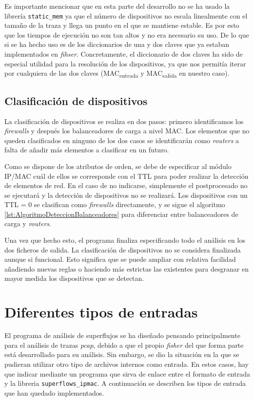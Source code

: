 \documentclass[twoside, 12pt]{epstfg}
\begin{document}
Es importante mencionar que en esta parte del desarrollo no se ha usado la librería \texttt{static\_mem} ya que el número de dispositivos no escala linealmente con el tamaño de la traza y llega un punto en el que se mantiene estable. Es por esto que los tiempos de ejecución no son tan altos y no era necesario su uso. De lo que si se ha hecho uso es de los diccionarios de una y dos claves que ya estaban implementados en \textit{fihser}. Concretamente, el diccionario de dos claves ha sido de especial utilidad para la resolución de los dispositivos, ya que nos permitía iterar por cualquiera de las dos claves (MAC\textsubscript{entrada} y MAC\textsubscript{salida} en nuestro caso).

\subsection{Clasificación de dispositivos}
La clasificación de dispositivos se realiza en dos pasos: primero identificamos los \textit{firewalls} y después los balanceadores de carga a nivel MAC. Los elementos que no queden clasificados en ninguno de los dos casos se identificarán como \textit{routers} a falta de añadir más elementos a clasificar en un futuro.

Como se dispone de los atributos de orden, se debe de especificar al módulo IP/MAC cuál de ellos se corresponde con el TTL para poder realizar la detección de elementos de red. En el caso de no indicarse, simplemente el postprocesado no se ejecutará y la detección de dispositivos no se realizará. Los dispositivos con un TTL = 0 se clasifican como \textit{firewalls} directamente, y se sigue el algoritmo \ref{lst:AlgoritmoDeteccionBalanceadores} para diferenciar entre balanceadores de carga y \textit{routers}.

Una vez que hecho esto, el programa finaliza especificando todo el análisis en los dos ficheros de salida. La clasificación de dispositivos no se considera finalizada aunque si funcional. Esto significa que se puede ampliar con relativa facilidad añadiendo nuevas reglas o haciendo más estrictas las existentes para desgranar en mayor medida los dispositivos que se detectan.


\section{Diferentes tipos de entradas}
El programa de análisis de superflujos se ha diseñado pensando principalmente para el análisis de trazas \textit{pcap}, debido a que el propio \textit{fisher} del que forma parte está desarrollado para su análisis. Sin embargo, se dio la situación en la que se pudieran utilizar otro tipo de archivos internos como entrada. En estos casos, hay que indicar mediante un programa que sirva de enlace entre el formato de entrada y la libreria \texttt{superflows\_ipmac}. A continuación se describen los tipos de entrada que han quedado implementados.
\end{document}
